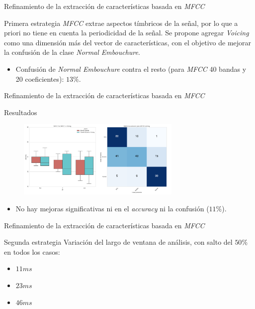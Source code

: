 \documentclass[aspectratio=169]{beamer}
\begin{document}
\begin{frame}{Refinamiento de la extracción de características basada en \textit{MFCC}}
\begin{block}{Primera estrategia}
\textit{MFCC} extrae aspectos tímbricos de la señal, por lo que a priori no tiene en cuenta la periodicidad de la señal. Se propone agregar \textit{Voicing} como una dimensión más del vector de características, con el objetivo de mejorar la confusión de la clase \textit{Normal Embouchure}.
\begin{itemize}
\item Confusión de \textit{Normal Embouchure} contra el resto (para \textit{MFCC} 40 bandas y 20 coeficientes): $13\%$.
\end{itemize}
\end{block}
\end{frame}

\begin{frame}{Refinamiento de la extracción de características basada en \textit{MFCC}}

\begin{block}{Resultados}
\begin{figure}[H]
\begin{center}
\includegraphics[width=0.7\textwidth]{exp3} 
\end{center}
\end{figure}
\end{block}
\begin{itemize}
\item No hay mejoras significativas ni en el \textit{accuracy} ni la confusión ($11\%$).
\end{itemize}
\end{frame}

\begin{frame}{Refinamiento de la extracción de características basada en \textit{MFCC}}
\begin{block}{Segunda estrategia}
Variación del largo de ventana de análisis, con salto del $50\%$ en todos los casos:
\begin{itemize}
\item $11ms$
\item $23ms$
\item $46ms$
\end{itemize}
\end{block}
\end{frame}
\end{document}
